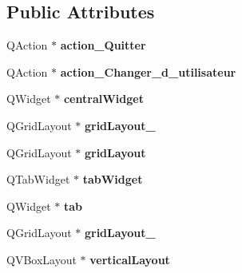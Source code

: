 \subsection*{Public Attributes}
\begin{DoxyCompactItemize}
\item 
\hypertarget{classUi__MainWindow_a16d39d241a02bfb61fab07149d15868f}{Q\-Action $\ast$ {\bfseries action\-\_\-\-Quitter}}\label{classUi__MainWindow_a16d39d241a02bfb61fab07149d15868f}

\item 
\hypertarget{classUi__MainWindow_a7699b501da4a634d45a4b8887ad17dbb}{Q\-Action $\ast$ {\bfseries action\-\_\-\-Changer\-\_\-d\-\_\-utilisateur}}\label{classUi__MainWindow_a7699b501da4a634d45a4b8887ad17dbb}

\item 
\hypertarget{classUi__MainWindow_a30075506c2116c3ed4ff25e07ae75f81}{Q\-Widget $\ast$ {\bfseries central\-Widget}}\label{classUi__MainWindow_a30075506c2116c3ed4ff25e07ae75f81}

\item 
\hypertarget{classUi__MainWindow_a6b2a0c5f7e8ff2a87134908dd770d2d2}{Q\-Grid\-Layout $\ast$ {\bfseries grid\-Layout\-\_}}\label{classUi__MainWindow_a6b2a0c5f7e8ff2a87134908dd770d2d2}

\item 
\hypertarget{classUi__MainWindow_a525ed3c5fe0784ac502ee222fba4e205}{Q\-Grid\-Layout $\ast$ {\bfseries grid\-Layout}}\label{classUi__MainWindow_a525ed3c5fe0784ac502ee222fba4e205}

\item 
\hypertarget{classUi__MainWindow_a3260b943854b841c986f47c4726ee7f9}{Q\-Tab\-Widget $\ast$ {\bfseries tab\-Widget}}\label{classUi__MainWindow_a3260b943854b841c986f47c4726ee7f9}

\item 
\hypertarget{classUi__MainWindow_a3efc28c664e9f5115095aafbbc5ac6bc}{Q\-Widget $\ast$ {\bfseries tab}}\label{classUi__MainWindow_a3efc28c664e9f5115095aafbbc5ac6bc}

\item 
\hypertarget{classUi__MainWindow_af42ea7d4c2e893181caad21e28166932}{Q\-Grid\-Layout $\ast$ {\bfseries grid\-Layout\-\_}}\label{classUi__MainWindow_af42ea7d4c2e893181caad21e28166932}

\item 
\hypertarget{classUi__MainWindow_aecd96a04789fcfec3f98d80390ad8184}{Q\-V\-Box\-Layout $\ast$ {\bfseries vertical\-Layout}}\label{classUi__MainWindow_aecd96a04789fcfec3f98d80390ad8184}


\end{DoxyCompactItemize}
